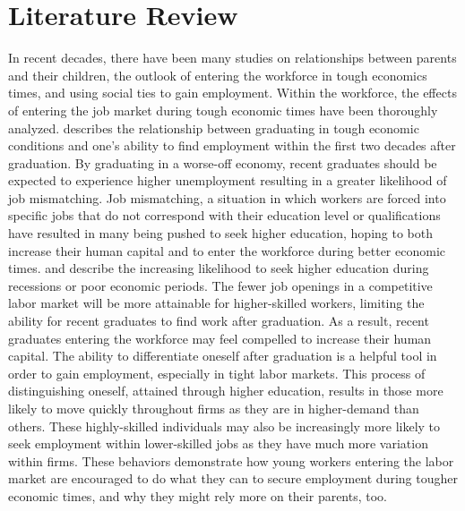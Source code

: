 \documentclass[12pt]{article}
\begin{document}
\section{Literature Review} \label{sec:literature}
In recent decades, there have been many studies on relationships between parents and their children, the outlook of entering the workforce in tough economics times, and using social ties to gain employment. Within the workforce, the effects of entering the job market during tough economic times have been thoroughly analyzed. \cite{kahn_long-term_2010} describes the relationship between graduating in tough economic conditions and one's ability to find employment within the first two decades after graduation. By graduating in a worse-off economy, recent graduates should be expected to experience higher unemployment resulting in a greater likelihood of job mismatching. Job mismatching, a situation in which workers are forced into specific jobs that do not correspond with their education level or qualifications have resulted in many being pushed to seek higher education, hoping to both increase their human capital and to enter the workforce during better economic times. \cite{schwandt_unlucky_2019} and \cite{oreopoulos_short-_2012} describe the increasing likelihood to seek higher education during recessions or poor economic periods. The fewer job openings in a competitive labor market will be more attainable for higher-skilled workers, limiting the ability for recent graduates to find work after graduation. As a result, recent graduates entering the workforce may feel compelled to increase their human capital. The ability to differentiate oneself after graduation is a helpful tool in order to gain employment, especially in tight labor markets. This process of distinguishing oneself, attained through higher education, results in those more likely to move quickly throughout firms as they are in higher-demand than others. These highly-skilled individuals  may also be increasingly more likely to seek employment within lower-skilled jobs as they have much more variation within firms. These behaviors demonstrate how young workers entering the labor market are encouraged to do what they can to secure employment during tougher economic times, and why they might rely more on their parents, too.
\end{document}
